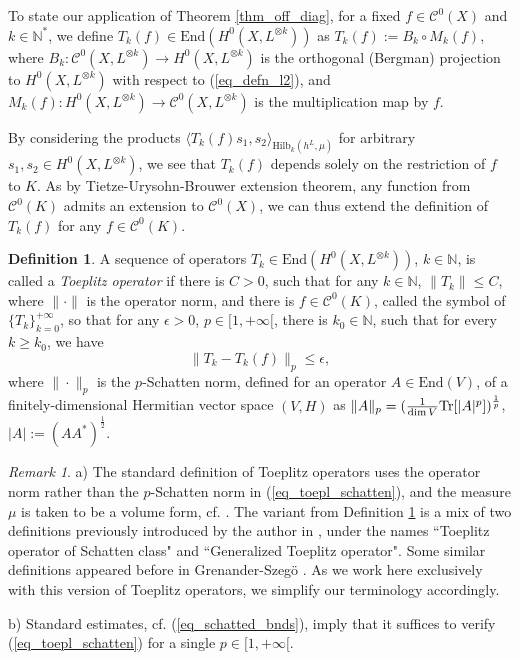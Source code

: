 \documentclass[12pt]{article}
\numberwithin{equation}{section}
\theoremstyle{theorem}
\theoremstyle{definition}
\newtheorem{defn}[thm]{Definition}
\theoremstyle{remark}
\newtheorem{rem}[thm]{Remark}
\newcommand{\nat}{\mathbb{N}}
\newcommand{\enmr}[1]{\text{End}{(#1)}}
\newcommand{\ccal}{\mathscr{C}}
\begin{document}
	\par 
	To state our application of Theorem \ref{thm_off_diag}, for a fixed $f \in \ccal^0(X)$ and $k \in \nat^*$, we define $T_k(f) \in {\enmr{H^0(X, L^{\otimes k})}}$ as $T_k(f) := B_k \circ M_k(f)$, where $B_k : \ccal^0(X, L^{\otimes k}) \to H^0(X, L^{\otimes k})$ is the orthogonal (Bergman) projection to $H^0(X, L^{\otimes k})$ with respect to (\ref{eq_defn_l2}), and $M_k(f) : H^0(X, L^{\otimes k}) \to \ccal^0 (X, L^{\otimes k})$ is the multiplication map by $f$.
	\par 
	By considering the products $\langle T_k(f) s_1, s_2 \rangle_{{\textrm{Hilb}}_k(h^L, \mu)}$ for arbitrary $s_1, s_2 \in H^0(X, L^{\otimes k})$, we see that $T_k(f)$ depends solely on the restriction of $f$ to $K$.
	As by Tietze-Urysohn-Brouwer extension theorem, any function from $\ccal^0(K)$ admits an extension to $\ccal^0(X)$, we can thus extend the definition of $T_k(f)$ for any $f \in \ccal^0(K)$.
	\begin{defn}\label{defn_toepl_sch}
		A sequence of operators $T_k \in {\enmr{H^0(X, L^{\otimes k})}}$, $k \in \nat$, is called a \textit{Toeplitz operator} if there is $C > 0$, such that for any $k \in \nat$, $\| T_k \| \leq C$, where $\| \cdot \|$ is the operator norm, and there is $f \in \ccal^0(K)$, called the symbol of $\{T_k\}_{k = 0}^{+ \infty}$, so that for any $\epsilon > 0$, $p \in [1, +\infty[$, there is $k_0 \in \nat$, such that for every $k \geq k_0$, we have
		\begin{equation}\label{eq_toepl_schatten}
			\big \| T_k -  T_k(f) \big \|_p \leq \epsilon,
		\end{equation}
		where $\| \cdot \|_p$ is the $p$-Schatten norm, defined for an operator $A \in {\enmr{V}}$, of a finitely-dimensional Hermitian vector space $(V, H)$ as $\| A \|_p = (\frac{1}{\dim V} {\rm{Tr}}[|A|^p])^{\frac{1}{p}}$, $|A| := (A A^*)^{\frac{1}{2}}$.
	\end{defn}
	\begin{rem}
		a) The standard definition of Toeplitz operators uses the operator norm rather than the $p$-Schatten norm in (\ref{eq_toepl_schatten}), and the measure $\mu$ is taken to be a volume form, cf. \cite{MaHol}. 
		The variant from Definition \ref{defn_toepl_sch} is a mix of two definitions previously introduced by the author in \cite{FinSubmToepl}, \cite{FinEigToepl} under the names “Toeplitz operator of Schatten class" and “Generalized Toeplitz operator". 
		Some similar definitions appeared before in Grenander-Szeg{\"o} \cite[\S 7.4]{GrenanSzego}.
		As we work here exclusively with this version of Toeplitz operators, we simplify our terminology accordingly.
		\par 
		b) 
		Standard estimates, cf. (\ref{eq_schatted_bnds}), imply that it suffices to verify (\ref{eq_toepl_schatten}) for a single $p \in [1, +\infty[$.
	\end{rem}
\end{document}
